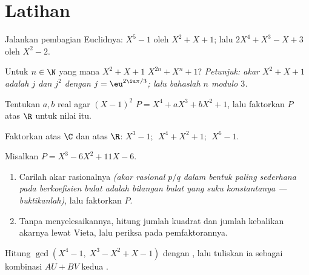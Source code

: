 \section{Latihan}

\begin{exercise}[$\star$]\label{exo:b1:poly:1}
Jalankan pembagian Euclidnya: $X^5 - 1$ oleh $X^2 + X + 1$; lalu
$2X^4 + X^3 - X + 3$ oleh $X^2 - 2$.
\end{exercise}

\begin{exercise}[$\star$]\label{exo:b1:poly:2}
Untuk $n \in \N$ yang mana $X^2 + X + 1$  $X^{2n} + X^n + 1$?
\emph{Petunjuk: akar $X^2 + X + 1$ adalah $j$ dan $j^2$ dengan $j =
\eu^{2\iu\pi/3}$; lalu bahaslah $n$ modulo $3$.}
\end{exercise}

\begin{exercise}[$\star$]\label{exo:b1:poly:3}
Tentukan $a, b$ real agar $(X-1)^2$  $P = X^4 + aX^3 +
bX^2 + 1$, lalu faktorkan $P$ atas $\R$ untuk nilai itu.
\end{exercise}

\begin{exercise}[$\star$]\label{exo:b1:poly:4}
Faktorkan atas $\C$ dan atas $\R$: $X^3 - 1$; $\;X^4 + X^2 + 1$;
$\;X^6 - 1$.
\end{exercise}

\begin{exercise}[$\star\star$]\label{exo:b1:poly:5}
Misalkan $P = X^3 - 6X^2 + 11X - 6$.
\begin{enumerate}
  \item Carilah akar rasionalnya \emph{(akar rasional $p/q$ dalam
        bentuk paling sederhana pada  berkoefisien bulat adalah bilangan bulat
        yang  suku konstantanya --- buktikanlah)}, lalu faktorkan $P$.
  \item Tanpa menyelesaikannya, hitung jumlah kuadrat dan jumlah
        kebalikan akarnya lewat Vieta, lalu periksa pada
        pemfaktorannya.
\end{enumerate}
\end{exercise}

\begin{exercise}[$\star\star$]\label{exo:b1:poly:6}
Hitung $\gcd(X^4 - 1,\; X^3 - X^2 + X - 1)$ dengan , lalu tuliskan ia sebagai kombinasi $AU + BV$ kedua
.
\end{exercise}

